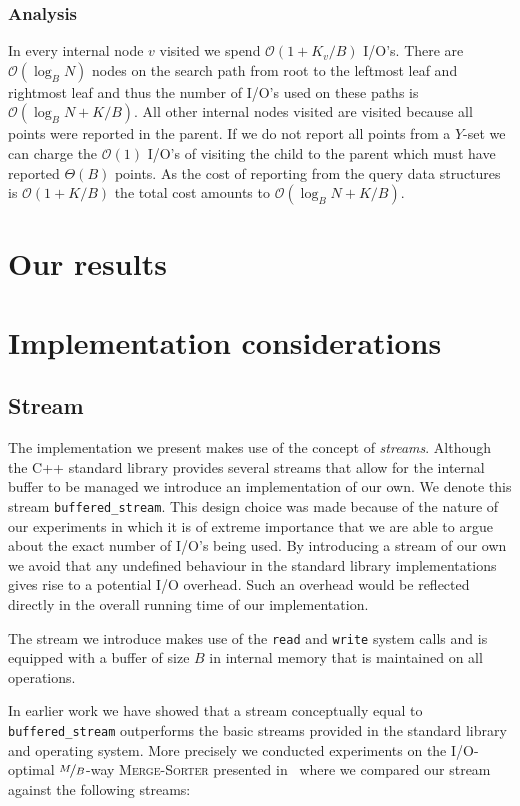 \documentclass[twoside,11pt,openright]{report}
\begin{document}
\subsection{Analysis}
In every internal node $v$ visited we spend $\mathcal{O}(1+K_v/B)$ I/O's. There are $\mathcal{O}(\log_B N)$ nodes on the search path from root to the leftmost leaf and rightmost leaf and thus the number of I/O's used on these paths is $\mathcal{O}(\log_B N + K/B)$. All other internal nodes visited are visited because all points were reported in the parent. If we do not report all points from a $Y$-set we can charge the $\mathcal{O}(1)$ I/O's of visiting the child to the parent which must have reported $\Theta(B)$ points. As the cost of reporting from the query data structures is $\mathcal{O}(1+K/B)$ the total cost amounts to $\mathcal{O}(\log_B N + K/B)$.

\chapter{Our results}

\chapter{Implementation considerations}

\section{Stream}
The implementation we present makes use of the concept of \textit{streams}. Although the C++ standard library provides several streams that allow for the internal buffer to be managed we introduce an implementation of our own. We denote this stream \texttt{buffered\_stream}. This design choice was made because of the nature of our experiments in which it is of extreme importance that we are able to argue about the exact number of I/O's being used. By introducing a stream of our own we avoid that any undefined behaviour in the standard library implementations gives rise to a potential I/O overhead. Such an overhead would be reflected directly in the overall running time of our implementation.

The stream we introduce makes use of the \texttt{read} and \texttt{write} system calls and is equipped with a buffer of size $B$ in internal memory that is maintained on all operations.

In earlier work we have showed that a stream conceptually equal to \texttt{buffered\_stream} outperforms the basic streams provided in the standard library and operating system. %
More precisely we conducted experiments on the I/O-optimal $\nicefrac{M}{B}$-way \textsc{Merge-Sorter} presented in~\cite{Aggarwal:1988/ICS/48529.48535} where we compared our stream against the following streams:
\end{document}
